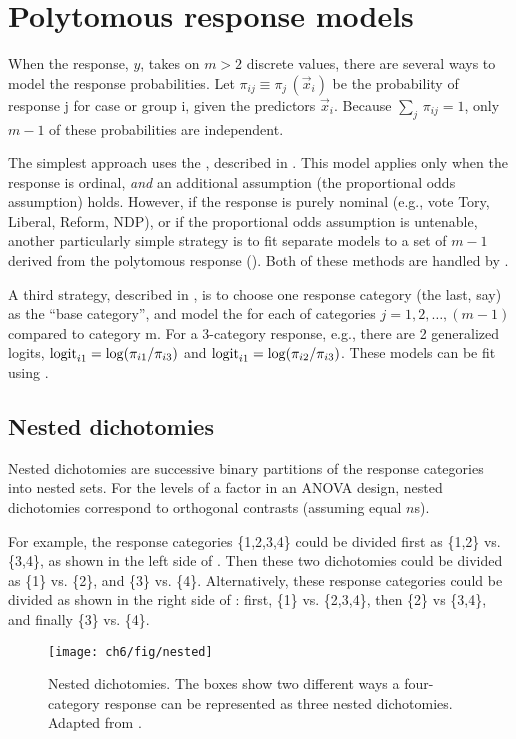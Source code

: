 \section{Polytomous response models}\label{sec:logist-poly}

When the response, $y$, takes on $m > 2$ discrete values, there are
several ways to model the response probabilities.  Let \(\pi_{ij} \equiv
\pi_j \,  ( \vec{x}_i )\) be the probability of response j for case
or group i, given the predictors $\vec{x}_i$.
Because \(\sum_j \,  \pi_{ij} = 1\), only \(m - 1\) of
these probabilities are independent.

The simplest approach uses
the 
, described in .
This model applies only when the response is ordinal,
\emph{and} an additional assumption
(the proportional odds assumption) holds.  
However, if the
response is purely nominal (e.g., vote Tory, Liberal, Reform, NDP),
or if the proportional odds assumption is untenable, another particularly
simple strategy is to fit separate models to a set of \(m - 1\)
 derived from the polytomous response
().
Both of these methods are handled by .

A third strategy, described in , is to choose one
    response category (the last, say) as the ``base category'', and
    model the  for each of categories
    \(j = 1, 2, \dots , (m - 1)\) compared to category m.  For a
    3-category response, e.g., there are 2 generalized logits,
     \(\logit_{i1}  = \log  ( { \pi_{i1} } /  { \pi_{i3} })\) and
     \(\logit_{i1}  = \log  ( { \pi_{i2} } /  { \pi_{i3} })\).
     These models can be fit using .


\subsection{Nested dichotomies}\label{sec:nested}

Nested dichotomies are successive binary partitions of the response
categories into nested sets.  For the levels of
a factor in an ANOVA design, nested dichotomies correspond to
orthogonal contrasts (assuming equal $n$s).

For example, the response categories
\{1,2,3,4\} could be divided first as \{1,2\} vs. \{3,4\}, as shown in the
left side of .  Then these two
dichotomies could be divided as \{1\} vs. \{2\}, and \{3\} vs. \{4\}.
Alternatively, these response categories could be divided as shown in the
right side of : first, \{1\} vs.
\{2,3,4\}, then \{2\} vs \{3,4\}, and finally \{3\} vs. \{4\}.  
\begin{figure}[htb]
  \centering
  \texttt{[image: ch6/fig/nested]}
  \caption[Nested dichotomies]{Nested dichotomies.  The boxes show two different ways a four-category response can be represented as three nested dichotomies. Adapted from \citet{Fox:97}.}\label{fig:nested}
\end{figure}

